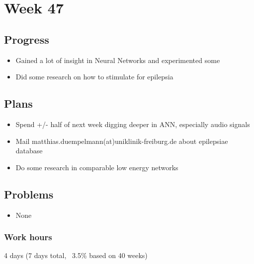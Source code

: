 \section*{Week 47}
    \subsection*{Progress}
        \begin{itemize}
            \item Gained a lot of insight in Neural Networks and experimented some
            \item Did some research on how to stimulate for epilepsia
        \end{itemize}
        
    \subsection*{Plans}
        \begin{itemize}
            \item Spend +/- half of next week digging deeper in ANN, especially audio signals
            \item Mail matthias.duempelmann(at)uniklinik-freiburg.de about epilepsiae database
            \item Do some research in comparable low energy networks
        \end{itemize}
    
    \subsection*{Problems}
        \begin{itemize}
            \item None
        \end{itemize}     
    
    \subsubsection*{Work hours}
        4 days (7 days total, ~3.5\% based on 40 weeks)